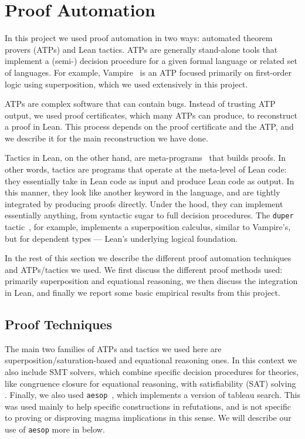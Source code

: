 \section{Proof Automation}\label{automated-sec}

In this project we used proof automation in two ways: automated theorem provers (ATPs) and Lean tactics.
ATPs are generally stand-alone tools that implement a (semi-) decision procedure for a given formal language or related set of languages.
For example, Vampire~\cite{DBLP:conf/cav/KovacsV13} is an ATP focused primarily on first-order logic using superposition, which we used extensively in this project.

ATPs are complex software that can contain bugs.
Instead of trusting ATP output, we used proof certificates, which many ATPs can produce, to reconstruct a proof in Lean.
This process depends on the proof certificate and the ATP, and we describe it for the main reconstruction we have done.

Tactics in Lean, on the other hand, are meta-programs~\cite{DBLP:journals/pacmpl/EbnerURAM17} that builds proofs.
In other words, tactics are programs that operate at the meta-level of Lean code: they essentially take in Lean code as input and produce Lean code as output.
In this manner, they look like another keyword in the language, and are tightly integrated by producing proofs directly.
Under the hood, they can implement essentially anything, from syntactic sugar to full decision procedures.
The \texttt{duper} tactic~\cite{DBLP:conf/itp/CluneQBA24}, for example, implements a superposition calculus, similar to Vampire's, but for dependent types --- Lean's underlying logical foundation.

In the rest of this section we describe the different proof automation techniques and ATPs/tactics we used.
We first discuss the different proof methods used: primarily superposition and equational reasoning, we then discuss the integration in Lean, and finally we report some basic empirical results from this project.

\subsection{Proof Techniques}

The main two families of ATPs and tactics we used here are superposition/saturation-based and equational reasoning ones.
In this context we also include SMT solvers, which combine specific decision procedures for theories, like congruence closure for equational reasoning, with satisfiability (SAT) solving .
Finally, we also used \texttt{aesop}~\cite{DBLP:conf/cpp/LimpergF23}, which implements a version of tableau search.
This was used mainly to help specific constructions in refutations, and is not specific to proving or disproving magma implications in this sense.
We will describe our use of \texttt{aesop} more in  below.

